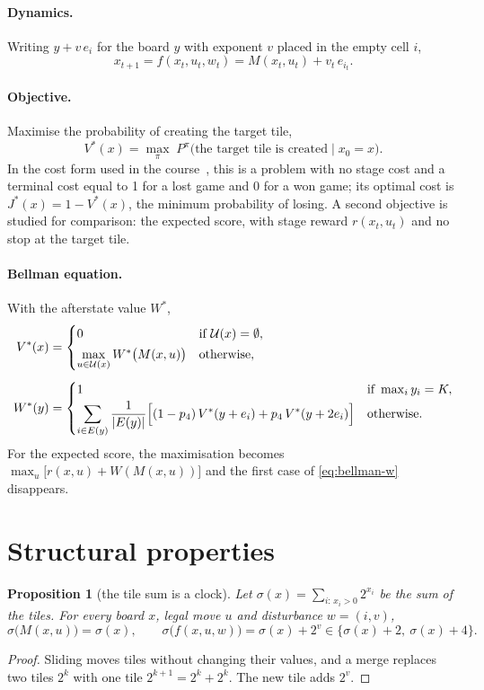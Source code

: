 \documentclass[11pt,a4paper]{article}
\newtheorem{proposition}{Proposition}
\theoremstyle{remark}
\newcommand{\U}{\mathcal{U}}
\begin{document}
\paragraph{Dynamics.} Writing $y+v\,e_i$ for the board $y$ with exponent $v$ placed in the empty cell $i$,
\[
x_{t+1}=f(x_t,u_t,w_t)=M(x_t,u_t)+v_t\,e_{i_t}.
\]

\paragraph{Objective.} Maximise the probability of creating the target tile,
\[
V^*(x)=\max_{\pi}\; P^{\pi}\bigl(\text{the target tile is created}\mid x_0=x\bigr).
\]
In the cost form used in the course~\cite{bertsekas}, this is a problem with no stage cost and a terminal cost equal to 1 for a lost game and 0 for a won game; its optimal cost is $J^*(x)=1-V^*(x)$, the minimum probability of losing. A second objective is studied for comparison: the expected score, with stage reward $r(x_t,u_t)$ and no stop at the target tile.

\paragraph{Bellman equation.} With the afterstate value $W^*$,
\begin{align}
V^*(x) &=
\begin{cases}
0 & \text{if } \U(x)=\emptyset,\\[2pt]
\max\limits_{u\in\U(x)} W^*\bigl(M(x,u)\bigr) & \text{otherwise},
\end{cases}
\label{eq:bellman-v}\\[4pt]
W^*(y) &=
\begin{cases}
1 & \text{if } \max_i y_i = K,\\[2pt]
\displaystyle\sum_{i\in E(y)} \frac{1}{|E(y)|}\Bigl[(1-p_4)\,V^*(y+e_i)+p_4\,V^*(y+2e_i)\Bigr] & \text{otherwise}.
\end{cases}
\label{eq:bellman-w}
\end{align}
For the expected score, the maximisation becomes $\max_{u}\bigl[r(x,u)+W(M(x,u))\bigr]$ and the first case of \eqref{eq:bellman-w} disappears.

\section{Structural properties}

\begin{proposition}[the tile sum is a clock]\label{prop:clock}
Let $\sigma(x)=\sum_{i:\,x_i>0}2^{x_i}$ be the sum of the tiles. For every board $x$, legal move $u$ and disturbance $w=(i,v)$,
\[
\sigma\bigl(M(x,u)\bigr)=\sigma(x),\qquad \sigma\bigl(f(x,u,w)\bigr)=\sigma(x)+2^{v}\in\{\sigma(x)+2,\ \sigma(x)+4\}.
\]
\end{proposition}
\begin{proof}
Sliding moves tiles without changing their values, and a merge replaces two tiles $2^k$ with one tile $2^{k+1}=2^k+2^k$. The new tile adds $2^v$.
\end{proof}
\end{document}
